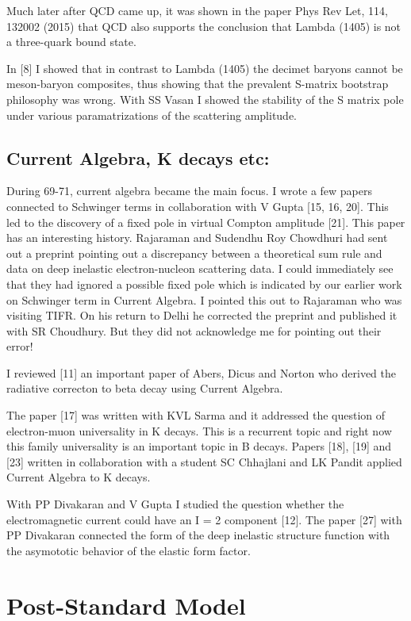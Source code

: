 Much later after QCD came up, it was shown in the paper Phys Rev Let, 
114, 132002 (2015) that QCD also supports the conclusion that Lambda 
(1405) is not a three-quark bound state.

In [8] I showed that in contrast to Lambda (1405) the decimet baryons 
cannot be meson-baryon composites, thus showing that the prevalent 
S-matrix bootstrap philosophy was wrong. With SS Vasan I showed the 
stability of the S matrix pole under various paramatrizations of the 
scattering amplitude.
 
\subsection*{Current Algebra, K decays etc: }

During 69-71, current algebra became the main focus. I wrote a few 
papers connected to Schwinger terms in collaboration with V Gupta 
[15, 16, 20]. This led to the discovery of a fixed pole in virtual Compton 
amplitude [21]. This paper has an interesting history. Rajaraman and 
Sudendhu Roy Chowdhuri had sent out a preprint pointing out a 
discrepancy between a theoretical sum rule and data on deep inelastic 
electron-nucleon scattering data. I could immediately see that they had 
ignored a possible fixed pole which is indicated by our earlier work on 
Schwinger term in Current Algebra. I pointed this out to Rajaraman who 
was visiting TIFR. On his return to Delhi he corrected the preprint and 
published it with SR Choudhury. But they did not acknowledge me for 
pointing out their error!

I reviewed [11] an important paper of Abers, Dicus and Norton who 
derived the radiative correcton to beta decay using Current Algebra.

The paper [17] was written with KVL Sarma and it addressed the question 
of electron-muon universality in K decays. This is a recurrent topic and 
right now this family universality is an important topic in B decays. 
Papers [18], [19] and [23] written in collaboration with a student SC 
Chhajlani and LK Pandit applied Current Algebra to K decays.

With PP Divakaran and V Gupta I studied the question whether the 
electromagnetic current could have an I = 2 component [12]. The paper 
[27] with PP Divakaran connected the form of the deep inelastic 
structure function with the asymototic behavior of the elastic form 
factor.

\section*{Post-Standard Model}


